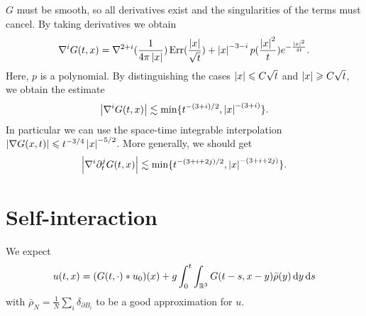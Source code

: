\documentclass[abstracton, paper=a4, fontsize=11pt,DIV=12,bibliography=totoc]{scrartcl}
\begin{document}
$G$ must be smooth, so all derivatives exist and the singularities of the terms must cancel. By taking derivatives we obtain 
\begin{align*}
    \nabla^i G(t,x)=\nabla^{2+i}(\frac{1}{4\pi\left\lvert x\right\rvert})\operatorname{Err}(\frac{\left\lvert x\right\rvert}{\sqrt{t}})+\left\lvert x\right\rvert^{-3-i}p(\frac{\left\lvert x\right\rvert^2}{t})e^{-\frac{\left\lvert x\right\rvert^2}{4t}}.
\end{align*}
Here, $p$ is a polynomial. By distinguishing the cases $\left\lvert x\right\rvert\leqslant C\sqrt{t}$ and $\left\lvert x\right\rvert\geqslant C\sqrt{t}$, we obtain the estimate
\begin{align*}
    \left\lvert\nabla^{i}G(t,x)\right\rvert\lesssim \min\{t^{-(3+i)/2},\left\lvert x\right\rvert^{-(3+i)}\}.
\end{align*}
In particular we can use the space-time integrable interpolation $\left\lvert\nabla G(x,t)\right\rvert\leqslant t^{-3/4}\left\lvert x\right\rvert^{-5/2}$.
More generally, we should get
\begin{align} \label{G.est}
    \left\lvert\nabla^{i} \partial_t^j G(t,x)\right\rvert\lesssim \min\{t^{-(3+i +2j)/2},\left\lvert x\right\rvert^{-(3+i+2j)}\}.
\end{align}

\section{Self-interaction}

We expect 
\begin{align*}
    u(t,x)=(G(t,\cdot)\ast u_0)(x)+g\int_0^t\int_{\mathbb{R}^3}G(t-s,x-y)\bar \rho (y)\, \mathrm{d} y\, \mathrm{d} s
\end{align*}
with  $\bar{\rho}_N=\frac 1N \sum_i \delta_{ \partial B_i}$ to be a good approximation for $u$. 
\end{document}
